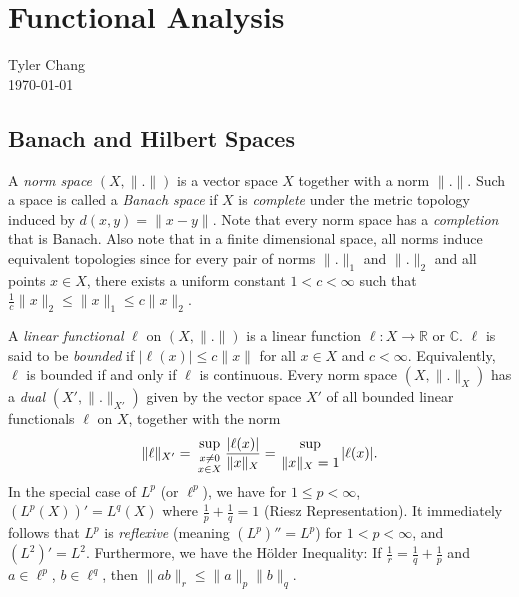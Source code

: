 \documentclass[12pt]{article}
\begin{document}
\section*{Functional Analysis}
Tyler Chang\\
\today

\subsection*{Banach and Hilbert Spaces}

A {\it norm space} $(X,\|.\|)$ is a vector space $X$ together with a norm
$\|.\|$. Such a space is called a {\it Banach space} if $X$ is 
{\it complete} under the metric topology induced by $d(x,y) = \|x - y\|$.
Note that every norm space has a {\it completion} that is Banach. Also
note that in a finite dimensional space, all norms induce equivalent
topologies since for every pair of norms $\|.\|_1$ and $\|.\|_2$ and
all points $x\in X$, there exists a uniform constant $1 < c< \infty$
such that $\frac{1}{c}\|x\|_2 \leq \|x\|_1 \leq c\|x\|_2$.

A {\it linear functional} $\ell$ on $(X,\|.\|)$ is a linear
function $\ell : X \rightarrow \mathbb{R}$ or $\mathbb{C}$.
$\ell$ is said to be {\it bounded} if $|\ell(x)| \leq c\|x\|$
for all $x\in X$ and $c < \infty$.
Equivalently, $\ell$ is bounded if and only if $\ell$ is continuous.
Every norm space $(X, \|.\|_X)$ has a {\it dual} $(X', \|.\|_{X'})$
given by the vector space $X'$ of all bounded linear functionals $\ell$
on $X$, together with the norm
$$
\|\ell\|_{X'} = {\sup \atop {x\neq 0 \atop x\in X}} \frac{|\ell(x)|}{\|x\|_X}
= {\sup \atop \|x\|_X = 1} |\ell(x)|.
$$
In the special case of $L^p$ (or $\ell^p$), we have for $1\leq p < \infty$,
$(L^p(X))' = L^q(X)$ where $\frac{1}{p} + \frac{1}{q} = 1$ (Riesz
Representation). It immediately follows that $L^p$ is {\it reflexive} 
(meaning $(L^p)'' = L^p$) for $1 < p < \infty$, and $(L^2)' = L^2$.
Furthermore, we have the H{\"o}lder Inequality: If 
$\frac{1}{r} = \frac{1}{q} + \frac{1}{p}$ and $a\in\ell^p$, $b\in\ell^q$,
then $\|ab\|_r \leq \|a\|_p \|b\|_q$.
\end{document}
